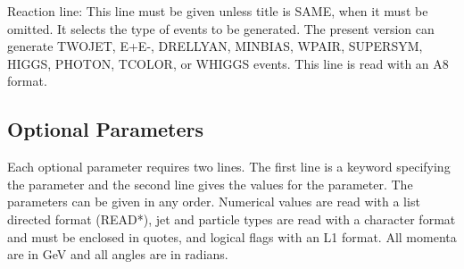       Reaction line: This line must be given unless title is SAME, when
it must be omitted. It selects the type of events to be generated. The
present version can generate TWOJET, E+E-, DRELLYAN, MINBIAS, WPAIR,
SUPERSYM, HIGGS, PHOTON, TCOLOR, or WHIGGS events. This line is read
with an A8 format.

\subsection{Optional Parameters}

      Each optional parameter requires two lines.
The first line is a keyword specifying the parameter and the second
line gives the values for the parameter. The parameters can be given in
any order. Numerical values are read with a list directed format
(READ*), jet and particle types are read with a character format and
must be enclosed in quotes, and logical flags with an L1 format. All
momenta are in GeV and all angles are in radians.

